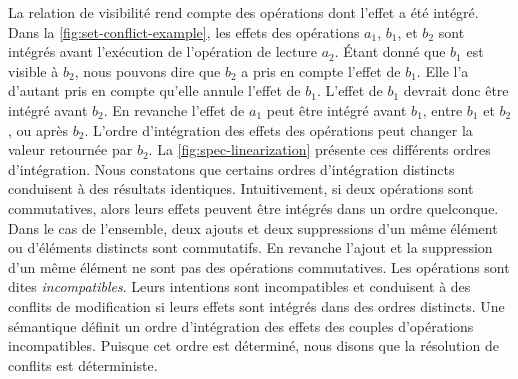 La relation de visibilité rend compte des opérations dont l'effet a été intégré.
Dans la \autoref{fig:set-conflict-example}, les effets des opérations $a_1$, $b_1$, et $b_2$ sont intégrés avant l'exécution de l'opération de lecture $a_2$.
Étant donné que $b_1$ est visible à $b_2$, nous pouvons dire que $b_2$ a pris en compte l'effet de $b_1$.
Elle l'a d'autant pris en compte qu'elle annule l'effet de $b_1$.
L'effet de $b_1$ devrait donc être intégré avant $b_2$.
En revanche l'effet de $a_1$ peut être intégré avant $b_1$, entre $b_1$ et $b_2$, ou après $b_2$.
L'ordre d'intégration des effets des opérations peut changer la valeur retournée par $b_2$.
La \autoref{fig:spec-linearization} présente ces différents ordres d'intégration.
Nous constatons que certains ordres d'intégration distincts conduisent à des résultats identiques.
Intuitivement, si deux opérations sont commutatives, alors leurs effets peuvent être intégrés dans un ordre quelconque.
Dans le cas de l'ensemble, deux ajouts et deux suppressions d'un même élément ou d'éléments distincts sont commutatifs.
En revanche l'ajout et la suppression d'un même élément ne sont pas des opérations commutatives.
Les opérations sont dites \emph{incompatibles}.
Leurs intentions sont incompatibles et conduisent à des conflits de modification si leurs effets sont intégrés dans des ordres distincts.
Une sémantique définit un ordre d'intégration des effets des couples d'opérations incompatibles.
Puisque cet ordre est déterminé, nous disons que la résolution de conflits est déterministe.

\clearpage

